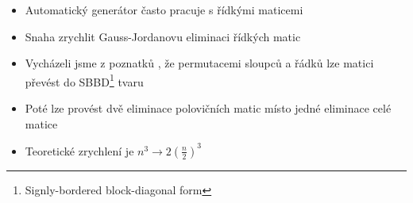 \documentclass[cmpiitalkstyle, 25pt]{cmptalk}
\begin{document}
\begin{cmptalkslide}
  \begin{itemize}
    \item Automatický generátor často pracuje s řídkými maticemi
    \item Snaha zrychlit Gauss-Jordanovu eliminaci řídkých matic
    \item Vycházeli jsme z poznatků \cite{SBBD}, že permutacemi sloupců a řádků lze matici převést do SBBD\footnote{Signly-bordered block-diagonal form} tvaru
    \item Poté lze provést dvě eliminace polovičních matic místo jedné eliminace celé matice
    \item Teoretické zrychlení je $n^3 \rightarrow 2\left(\frac{n}{2}\right)^3$
  \end{itemize}

\end{cmptalkslide}
\end{document}
